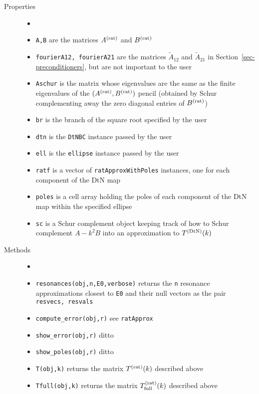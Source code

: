 \begin{description}
 \item[Properties]
   \begin{itemize}
    \item[]
    \item {\tt A,B} are the matrices $A^{(\text{rat})}$ and $B^{(\text{rat})}$
    \item {\tt fourierA12, fourierA21} are the matrices $\tilde{A}_{12}$ and
          $\tilde{A}_{21}$ in Section~\ref{sec-preconditioners}, but are not
          important to the user
    \item {\tt Aschur} is the matrix whose eigenvalues are the same as
          the finite eigenvalues of the $(A^{(\text{rat})},B^{(\text{rat})})$ pencil (obtained by
          Schur complementing away the zero diagonal entries of $B^{(\text{rat})}$)
    \item {\tt br} is the branch of the square root specified by the user
    \item {\tt dtn} is the {\tt DtNBC} instance passed by the user
    \item {\tt ell} is the {\tt ellipse} instance passed by the user 
    \item {\tt ratf} is a vector of {\tt ratApproxWithPoles}
          instances, one for each component of the DtN map
    \item {\tt poles} is a cell array holding the poles of each
          component of the DtN map within the specified ellipse
    \item {\tt sc} is a Schur complement object keeping track of how
          to Schur complement $A-k^2 B$ into an approximation to $T^{(\text{DtN})}(k)$
   \end{itemize}
 \item[Methods]
   \begin{itemize}
    \item[]
    \item {\tt resonances(obj,n,E0,verbose)} returns the {\tt n}
          resonance approximations closest to {\tt E0} and their
          null vectors as the pair {\tt resvecs, resvals}
    \item {\tt compute\_error(obj,r)} see {\tt ratApprox}
    \item {\tt show\_error(obj,r)} ditto
    \item {\tt show\_poles(obj,r)} ditto
    \item {\tt T(obj,k)} returns the matrix $T^{(\text{rat})}(k)$ described above
    \item {\tt Tfull(obj,k)} returns the matrix $T^{(\text{rat})}_{\text{full}}(k)$
          described above
   \end{itemize}
\end{description}

